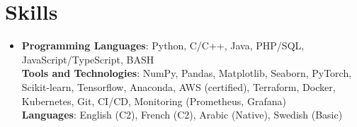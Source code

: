 \documentclass[letterpaper,12t]{article}
\begin{document}
\section{Skills}
    \begin{itemize}[leftmargin=0.15in, label={}]
        \item{
        \textbf{Programming Languages}{: Python, C/C++, Java, PHP/SQL, JavaScript/TypeScript, BASH} \\
        \textbf{Tools and Technologies}{: NumPy, Pandas, Matplotlib, Seaborn, PyTorch, Scikit-learn, Tensorflow, Anaconda, AWS (certified), Terraform, Docker, Kubernetes, Git, CI/CD, Monitoring (Prometheus, Grafana)} \\
        \textbf{Languages}{: English (C2), French (C2), Arabic (Native), Swedish (Basic)} \\
        }
    \end{itemize}

\end{document}
